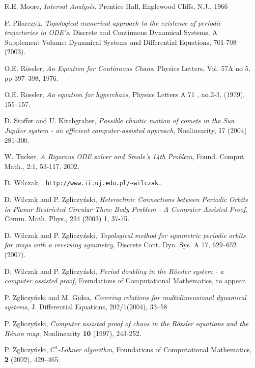 \documentclass[10pt,a4paper]{article}
\begin{document}
\begin{thebibliography}{GSS}
 R.E. Moore, \emph{Interval Analysis.} Prentice
Hall, Englewood Cliffs, N.J., 1966


 P. Pilarczyk, \emph{Topological numerical approach to the existence of periodic trajectories in ODE's},
Discrete and Continuous Dynamical Systems, A Supplement Volume:
Dynamical Systems and Differential Equations, 701-708 (2003).


 O.E. R\"ossler, \emph{An Equation for Continuous Chaos}, Physics Letters, Vol. 57A no 5, pp 397--398, 1976.

 O.E. R\"ossler, \emph{An equation for hyperchaos}, Physics Letters A 71 , no.2-3, (1979), 155--157.

 D. Stoffer and U. Kirchgraber, \emph{Possible chaotic motion of comets in the Sun Jupiter system -
an efficient computer-assisted approach}, Nonlinearity, 17 (2004)
281-300.

 W. Tucker, \emph{A Rigorous ODE solver and Smale's 14th Problem},
Found. Comput. Math., 2:1, 53-117, 2002.

 D. Wilczak, {\tt
http://www.ii.uj.edu.pl/\~{}wilczak.}

 D. Wilczak and P. Zgliczy\'nski, \emph{Heteroclinic Connections between Periodic Orbits in
Planar Restricted Circular Three Body Problem - A Computer Assisted
Proof}, Comm. Math. Phys.,  234 (2003) 1, 37-75.

 D. Wilczak and P. Zgliczy\'nski, \emph{Topological method
for symmetric periodic orbits for maps with a reversing symmetry},
 Discrete Cont. Dyn. Sys. A 17, 629--652 (2007).

 D. Wilczak and P. Zgliczy\'nski, \emph{Period doubling in the R\"ossler system - a computer assisted proof},
 Foundations of Computational Mathematics, to appear.

 P. Zgliczy\'nski and  M. Gidea, \emph{Covering relations for multidimensional
     dynamical systems},  J.  Differential Equations, 202/1(2004), 33--58

 P. Zgliczy\'nski, \emph{Computer assisted proof of
chaos in the R\"ossler equations and the H\'enon map},  Nonlinearity {\bf 10}
(1997), 243-252.

 P. Zgliczy\'nski,  \emph{$C^1$-Lohner algorithm}, Foundations
of Computational Mathematics, {\bf 2} (2002), 429--465.

\end{thebibliography}
\end{document}
